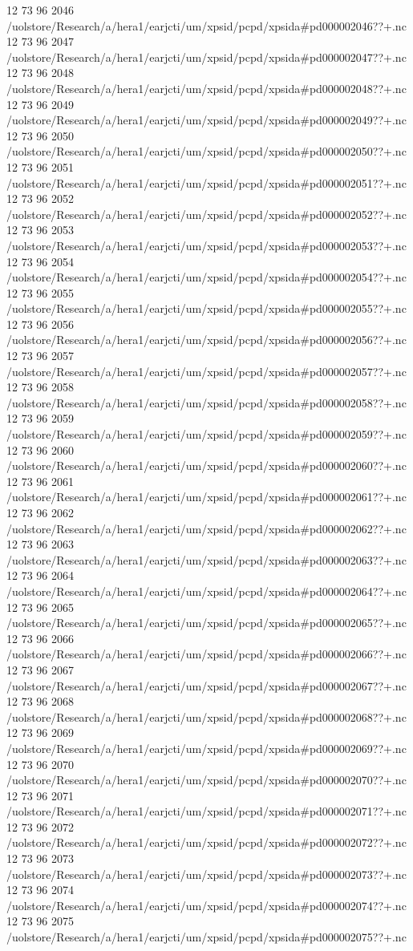 12 73 96
2046
/uolstore/Research/a/hera1/earjcti/um/xpsid/pcpd/xpsida#pd000002046??+.nc
12 73 96
2047
/uolstore/Research/a/hera1/earjcti/um/xpsid/pcpd/xpsida#pd000002047??+.nc
12 73 96
2048
/uolstore/Research/a/hera1/earjcti/um/xpsid/pcpd/xpsida#pd000002048??+.nc
12 73 96
2049
/uolstore/Research/a/hera1/earjcti/um/xpsid/pcpd/xpsida#pd000002049??+.nc
12 73 96
2050
/uolstore/Research/a/hera1/earjcti/um/xpsid/pcpd/xpsida#pd000002050??+.nc
12 73 96
2051
/uolstore/Research/a/hera1/earjcti/um/xpsid/pcpd/xpsida#pd000002051??+.nc
12 73 96
2052
/uolstore/Research/a/hera1/earjcti/um/xpsid/pcpd/xpsida#pd000002052??+.nc
12 73 96
2053
/uolstore/Research/a/hera1/earjcti/um/xpsid/pcpd/xpsida#pd000002053??+.nc
12 73 96
2054
/uolstore/Research/a/hera1/earjcti/um/xpsid/pcpd/xpsida#pd000002054??+.nc
12 73 96
2055
/uolstore/Research/a/hera1/earjcti/um/xpsid/pcpd/xpsida#pd000002055??+.nc
12 73 96
2056
/uolstore/Research/a/hera1/earjcti/um/xpsid/pcpd/xpsida#pd000002056??+.nc
12 73 96
2057
/uolstore/Research/a/hera1/earjcti/um/xpsid/pcpd/xpsida#pd000002057??+.nc
12 73 96
2058
/uolstore/Research/a/hera1/earjcti/um/xpsid/pcpd/xpsida#pd000002058??+.nc
12 73 96
2059
/uolstore/Research/a/hera1/earjcti/um/xpsid/pcpd/xpsida#pd000002059??+.nc
12 73 96
2060
/uolstore/Research/a/hera1/earjcti/um/xpsid/pcpd/xpsida#pd000002060??+.nc
12 73 96
2061
/uolstore/Research/a/hera1/earjcti/um/xpsid/pcpd/xpsida#pd000002061??+.nc
12 73 96
2062
/uolstore/Research/a/hera1/earjcti/um/xpsid/pcpd/xpsida#pd000002062??+.nc
12 73 96
2063
/uolstore/Research/a/hera1/earjcti/um/xpsid/pcpd/xpsida#pd000002063??+.nc
12 73 96
2064
/uolstore/Research/a/hera1/earjcti/um/xpsid/pcpd/xpsida#pd000002064??+.nc
12 73 96
2065
/uolstore/Research/a/hera1/earjcti/um/xpsid/pcpd/xpsida#pd000002065??+.nc
12 73 96
2066
/uolstore/Research/a/hera1/earjcti/um/xpsid/pcpd/xpsida#pd000002066??+.nc
12 73 96
2067
/uolstore/Research/a/hera1/earjcti/um/xpsid/pcpd/xpsida#pd000002067??+.nc
12 73 96
2068
/uolstore/Research/a/hera1/earjcti/um/xpsid/pcpd/xpsida#pd000002068??+.nc
12 73 96
2069
/uolstore/Research/a/hera1/earjcti/um/xpsid/pcpd/xpsida#pd000002069??+.nc
12 73 96
2070
/uolstore/Research/a/hera1/earjcti/um/xpsid/pcpd/xpsida#pd000002070??+.nc
12 73 96
2071
/uolstore/Research/a/hera1/earjcti/um/xpsid/pcpd/xpsida#pd000002071??+.nc
12 73 96
2072
/uolstore/Research/a/hera1/earjcti/um/xpsid/pcpd/xpsida#pd000002072??+.nc
12 73 96
2073
/uolstore/Research/a/hera1/earjcti/um/xpsid/pcpd/xpsida#pd000002073??+.nc
12 73 96
2074
/uolstore/Research/a/hera1/earjcti/um/xpsid/pcpd/xpsida#pd000002074??+.nc
12 73 96
2075
/uolstore/Research/a/hera1/earjcti/um/xpsid/pcpd/xpsida#pd000002075??+.nc
